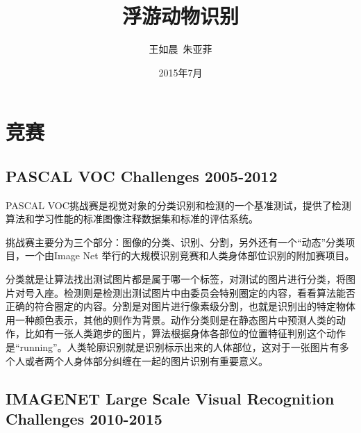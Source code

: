 \documentclass[12pt]{article}
\begin{document}
\title{\vspace{-2em}浮游动物识别\vspace{-0.7em}}
\author{王如晨\ 朱亚菲}
\date{\vspace{-0.7em}2015年7月\vspace{-0.7em}}
\maketitle\thispagestyle{fancy}
\maketitle
\tableofcontents 


\section{竞赛}


\subsection{PASCAL VOC Challenges 2005-2012}

PASCAL VOC挑战赛是视觉对象的分类识别和检测的一个基准测试，提供了检测算法和学习性能的标准图像注释数据集和标准的评估系统。

挑战赛主要分为三个部分：图像的分类、识别、分割，另外还有一个“动态”分类项目，一个由Image Net 举行的大规模识别竞赛和人类身体部位识别的附加赛项目。

分类就是让算法找出测试图片都是属于哪一个标签，对测试的图片进行分类，将图片对号入座。检测则是检测出测试图片中由委员会特别圈定的内容，看看算法能否正确的符合圈定的内容。分割是对图片进行像素级分割，也就是识别出的特定物体用一种颜色表示，其他的则作为背景。动作分类则是在静态图片中预测人类的动作，比如有一张人类跑步的图片，算法根据身体各部位的位置特征判别这个动作是“running”。人类轮廓识别就是识别标示出来的人体部位，这对于一张图片有多个人或者两个人身体部分纠缠在一起的图片识别有重要意义。

\subsection{IMAGENET Large Scale Visual Recognition Challenges 2010-2015}
\end{document}
